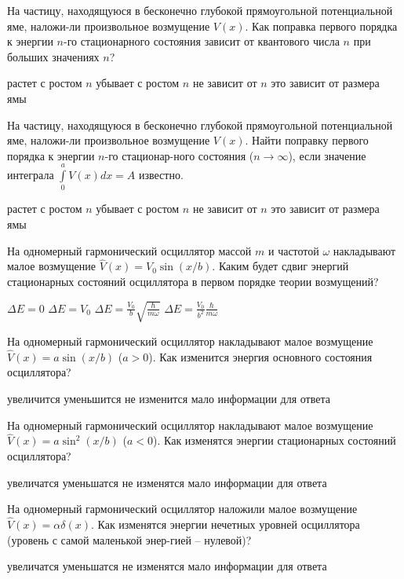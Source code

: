 \documentclass[11pt,a4paper]{exam}
\begin{document}
\begin{questions}
\question На частицу, находящуюся в бесконечно глубокой прямоугольной потенциальной яме, наложи-ли произвольное возмущение $V(x)$. Как поправка первого порядка к энергии $n$-го стационарного состояния зависит от квантового числа $n$ при больших значениях $n$?
\begin{choices}
\choice растет с ростом $n$        
\choice убывает с ростом $n$
\choice не зависит от $n$       
\choice это зависит от размера ямы
\end{choices}

\question На частицу, находящуюся в бесконечно глубокой прямоугольной потенциальной яме, наложи-ли произвольное возмущение $V(x)$. Найти поправку первого порядка к энергии $n$-го стационар-ного состояния ($n \to \infty $), если значение интеграла $\int\limits_0^a {V(x)dx}  = A$ известно.
\begin{choices}
\choice растет с ростом $n$        
\choice убывает с ростом $n$
\choice не зависит от $n$       
\choice это зависит от размера ямы
\end{choices}

\question На одномерный гармонический осциллятор массой $m$ и частотой $\omega $ накладывают малое возмущение $\hat V(x) = {V_0}\sin (x/b)$. Каким будет сдвиг энергий стационарных состояний осциллятора в первом порядке теории возмущений?
\begin{choices}
\choice $\Delta E = 0$ 
\choice $\Delta E = {V_0}$   
\choice $\Delta E = \frac{{{V_0}}}{b}\sqrt {\frac{\hbar }{{m\omega }}} $  
\choice $\Delta E = \frac{{{V_0}}}{{{b^2}}}\frac{\hbar }{{m\omega }}$
\end{choices}

\question На одномерный гармонический осциллятор накладывают малое возмущение $\hat V(x) = a\sin (x/b)$ ($a > 0$). Как изменится энергия основного состояния осциллятора? 
\begin{choices}
\choice увеличится  
\choice уменьшится  
\choice не изменится   
\choice мало информации для ответа
\end{choices}

\question На одномерный гармонический осциллятор накладывают малое возмущение $\hat V(x) = a{\sin ^2}(x/b)$ ($a < 0$). Как изменятся энергии стационарных состояний осциллятора? 
\begin{choices}
\choice увеличатся     
\choice уменьшатся  
\choice не изменятся   
\choice мало информации для ответа
\end{choices}

\question На одномерный гармонический осциллятор наложили малое возмущение $\hat V(x) = \alpha \delta (x)$. Как изменятся энергии нечетных уровней осциллятора (уровень с самой маленькой энер-гией – нулевой)?
\begin{choices}
\choice увеличатся     
\choice уменьшатся  
\choice не изменятся   
\choice мало информации для ответа
\end{choices}


\end{questions}
\end{document}

